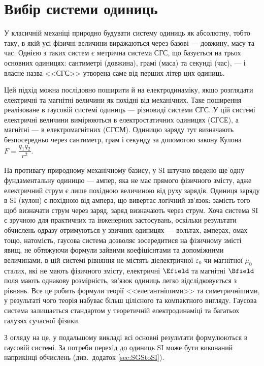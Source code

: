 

\chapter*{Вибір системи одиниць}\label{\currfilebase}

У класичній механіці природно будувати систему одиниць як абсолютну, тобто таку, в якій усі фізичні величини виражаються через базові --- довжину, масу та час. Однією з таких систем є метрична система СГС, що базується на трьох основних одиницях: сантиметрі (довжина), грамі (маса) та секунді (час), --- і власне назва <<СГС>> утворена саме від перших літер цих одиниць.

Цей підхід можна послідовно поширити й на електродинаміку, якщо розглядати електричні та магнітні величини як похідні від механічних. Таке поширення реалізоване в гаусовій системі одиниць --- різновиді системи СГС. У цій системі електричні величини вимірюються в електростатичних одиницях (СГСЕ), а магнітні --- в електромагнітних (СГСМ). Одиницю заряду тут визначають безпосередньо через сантиметр, грам і секунду за допомогою закону Кулона \(F = \dfrac{q_1 q_2}{r^2}\).

На противагу природному механічному базису, у SI штучно введено ще одну фундаментальну одиницю --- ампер, яка не має прямого фізичного змісту, адже електричний струм є лише похідною величиною від руху зарядів. Одиниця заряду в SI (кулон) є похідною від ампера, що вивертає логічний зв'язок: замість того щоб визначати струм через заряд, заряд визначають через струм. Хоча система SI є зручною для практичних та інженерних застосувань, оскільки результати обчислень одразу отримуються у звичних одиницях --- вольтах, амперах, омах тощо, натомість, гаусова система дозволяє зосередитися на фізичному змісті явищ, не обтяжуючи формули зайвими коефіцієнтами та допоміжними величинами, в цій системі рівняння не містять діелектричної \( \varepsilon _{0}\) чи магнітної \(\mu _{0}\) сталих, які не мають фізичного змісту, електричні $\Efield$ та магнітні $\Bfield$ поля мають однакову розмірність, зв'язок одиниць легко відслідковується з рівнянь. Все це робить формули теорії <<елегантнішими>> та симетричнішими, у результаті чого теорія набуває більш цілісного та компактного вигляду. Гаусова система залишається стандартом у теоретичній електродинаміці та багатьох галузях сучасної фізики.

З огляду на це, у подальшому викладі всі основні результати формулюються в гаусовій системі. За потреби перехід до одиниць SI може бути виконаний наприкінці обчислень (див.~додаток \ref{sec:SGStoSI}).
